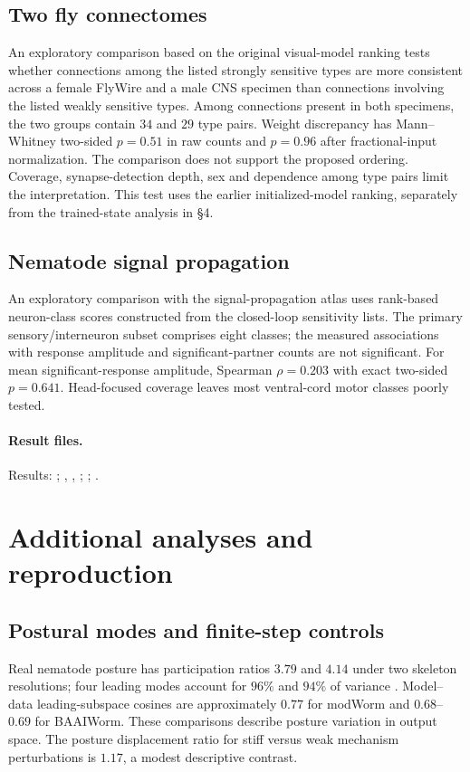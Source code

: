 \documentclass[11pt,letterpaper]{article}
\begin{document}
\subsection{Two fly connectomes}
An exploratory comparison based on the original visual-model ranking tests whether connections among the listed strongly sensitive types are more consistent across a female FlyWire and a male CNS specimen than connections involving the listed weakly sensitive types. Among connections present in both specimens, the two groups contain $34$ and $29$ type pairs. Weight discrepancy has Mann--Whitney two-sided $p=0.51$ in raw counts and $p=0.96$ after fractional-input normalization. The comparison does not support the proposed ordering. Coverage, synapse-detection depth, sex and dependence among type pairs limit the interpretation. This test uses the earlier initialized-model ranking, separately from the trained-state analysis in \S4.

\subsection{Nematode signal propagation}
An exploratory comparison with the signal-propagation atlas \citep{randi2023atlas} uses rank-based neuron-class scores constructed from the closed-loop sensitivity lists. The primary sensory/interneuron subset comprises eight classes; the measured associations with response amplitude and significant-partner counts are not significant. For mean significant-response amplitude, Spearman $\rho=0.203$ with exact two-sided $p=0.641$. Head-focused coverage leaves most ventral-cord motor classes poorly tested.

\paragraph{Result files.}
Results: ; , , ; ; .

\section{Additional analyses and reproduction}
\subsection{Postural modes and finite-step controls}
Real nematode posture has participation ratios $3.79$ and $4.14$ under two skeleton resolutions; four leading modes account for $96\%$ and $94\%$ of variance \citep{stephens2008dimensionality}. Model--data leading-subspace cosines are approximately $0.77$ for modWorm and $0.68$--$0.69$ for BAAIWorm. These comparisons describe posture variation in output space. The posture displacement ratio for stiff versus weak mechanism perturbations is $1.17$, a modest descriptive contrast.
\end{document}
